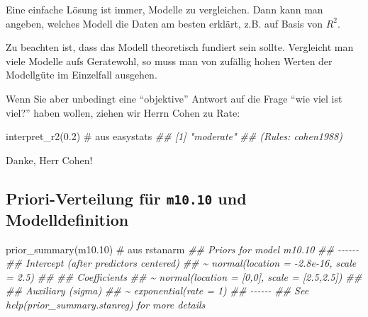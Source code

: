 \documentclass[
  a4paper,
  DIV=11]{scrreprt}
\newenvironment{Shaded}{\begin{snugshade}}{\end{snugshade}}
\newcommand{\CommentTok}[1]{\textcolor[rgb]{0.37,0.37,0.37}{#1}}
\newcommand{\DocumentationTok}[1]{\textcolor[rgb]{0.37,0.37,0.37}{\textit{#1}}}
\newcommand{\FloatTok}[1]{\textcolor[rgb]{0.68,0.00,0.00}{#1}}
\newcommand{\FunctionTok}[1]{\textcolor[rgb]{0.28,0.35,0.67}{#1}}
\newcommand{\NormalTok}[1]{\textcolor[rgb]{0.00,0.23,0.31}{#1}}
\theoremstyle{definition}
\theoremstyle{remark}
\begin{document}
Eine einfache Lösung ist immer, Modelle zu vergleichen. Dann kann man
angeben, welches Modell die Daten am besten erklärt, z.B. auf Basis von
\(R^2\).

Zu beachten ist, dass das Modell theoretisch fundiert sein sollte.
Vergleicht man viele Modelle aufs Geratewohl, so muss man von zufällig
hohen Werten der Modellgüte im Einzelfall ausgehen.

Wenn Sie aber unbedingt eine ``objektive'' Antwort auf die Frage ``wie
viel ist viel?'' haben wollen, ziehen wir Herrn Cohen zu Rate:

\begin{Shaded}
\begin{Highlighting}[]
\FunctionTok{interpret\_r2}\NormalTok{(}\FloatTok{0.2}\NormalTok{)  }\CommentTok{\# aus \textasciigrave{}easystats\textasciigrave{}}
\DocumentationTok{\#\# [1] "moderate"}
\DocumentationTok{\#\# (Rules: cohen1988)}
\end{Highlighting}
\end{Shaded}

Danke, Herr Cohen!

\hypertarget{priori-verteilung-fuxfcr-m10.10-und-modelldefinition}{%
\subsection{\texorpdfstring{Priori-Verteilung für \texttt{m10.10} und
Modelldefinition}{Priori-Verteilung für m10.10 und Modelldefinition}}\label{priori-verteilung-fuxfcr-m10.10-und-modelldefinition}}

\begin{Shaded}
\begin{Highlighting}[]
\FunctionTok{prior\_summary}\NormalTok{(m10}\FloatTok{.10}\NormalTok{)  }\CommentTok{\# aus rstanarm}
\DocumentationTok{\#\# Priors for model \textquotesingle{}m10.10\textquotesingle{} }
\DocumentationTok{\#\# {-}{-}{-}{-}{-}{-}}
\DocumentationTok{\#\# Intercept (after predictors centered)}
\DocumentationTok{\#\#  \textasciitilde{} normal(location = {-}2.8e{-}16, scale = 2.5)}
\DocumentationTok{\#\# }
\DocumentationTok{\#\# Coefficients}
\DocumentationTok{\#\#  \textasciitilde{} normal(location = [0,0], scale = [2.5,2.5])}
\DocumentationTok{\#\# }
\DocumentationTok{\#\# Auxiliary (sigma)}
\DocumentationTok{\#\#  \textasciitilde{} exponential(rate = 1)}
\DocumentationTok{\#\# {-}{-}{-}{-}{-}{-}}
\DocumentationTok{\#\# See help(\textquotesingle{}prior\_summary.stanreg\textquotesingle{}) for more details}
\end{Highlighting}
\end{Shaded}
\end{document}
